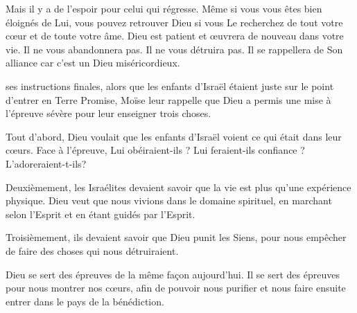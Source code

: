 Mais il y a de l'espoir pour celui qui régresse.
 Même si vous vous êtes bien éloignés de Lui, vous pouvez retrouver Dieu
 si vous Le recherchez de tout votre cœur et de toute votre âme.
 Dieu est patient et œuvrera de nouveau dans votre vie.
 Il ne vous abandonnera pas. Il ne vous détruira pas.
 Il se rappellera de Son alliance car c'est un Dieu miséricordieux. 

\dvrule






 ses instructions finales,
 alors que les enfants d'Israël étaient juste sur le point
 d'entrer en Terre Promise, Moïse leur rappelle que Dieu
 a permis une mise à l'épreuve sévère pour leur enseigner trois choses.

Tout d'abord, Dieu voulait que les enfants d'Israël voient
 ce qui était dans leur cœurs.
 Face à l'épreuve, Lui obéiraient-ils ?
 Lui feraient-ils confiance ? L'adoreraient-t-ils?


Deuxièmement, les Israélites devaient savoir que la vie
 est plus qu'une expérience physique.
 Dieu veut que nous vivions dans le domaine spirituel,
 en marchant selon l'Esprit et en étant guidés par l'Esprit.

Troisièmement, ils devaient savoir que Dieu punit les Siens,
 pour nous empêcher de faire des choses qui nous détruiraient.

Dieu se sert des épreuves de la même façon aujourd'hui.
 Il se sert des épreuves pour nous montrer nos cœurs,
 afin de pouvoir nous purifier et nous faire ensuite entrer
 dans le pays de la bénédiction. 

\dvrule




